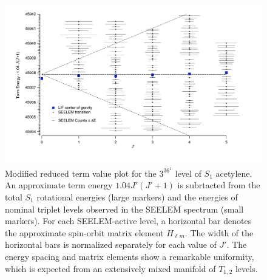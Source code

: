 \documentclass[12pt]{mitthesis}
\begin{document}
\begin{figure}
  \caption{Modified reduced term value plot for the $3^36^1$ 
    level of $S_1$ acetylene.  An approximate term energy
    $1.04J'(J'+1)$ is subrtacted from the total $S_1$ rotational
    energies (large markers) and the energies of nominal triplet
    levels observed in the SEELEM spectrum (small markers).  For each
    SEELEM-active level, a horizontal bar denotes the approximate
    spin-orbit matrix element $H_{\ell m}$.  The width of the
    horizontal bars is normalized separately for each value of $J'$.
    The energy spacing and matrix elements show a remarkable
    uniformity, which is expected from an extensively mixed manifold
    of $T_{1,2}$ levels.}
  \label{fig:unfold}
  \centering
  \vspace{10mm}
  \includegraphics[width=6.2in]{redterms-3361-unfolded}
\end{figure}

\end{document}
